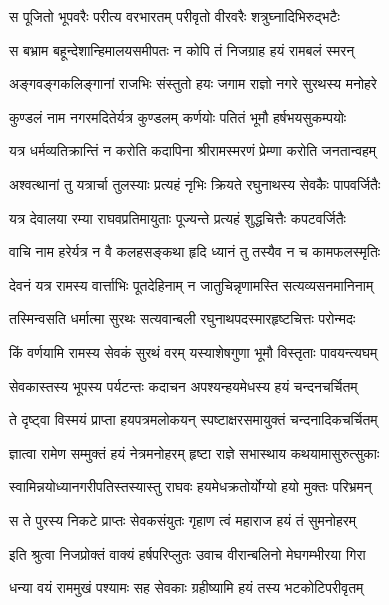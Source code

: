 \twolineshloka
{स पूजितो भूपवरैः परीत्य वरभारतम्}
{परीवृतो वीरवरैः शत्रुघ्नादिभिरुद्भटैः}%

\twolineshloka
{स बभ्राम बहून्देशान्हिमालयसमीपतः}
{न कोपि तं निजग्राह हयं रामबलं स्मरन्}%

\twolineshloka
{अङ्गवङ्गकलिङ्गानां राजभिः संस्तुतो हयः}
{जगाम राज्ञो नगरे सुरथस्य मनोहरे}%

\twolineshloka
{कुण्डलं नाम नगरमदितेर्यत्र कुण्डलम्}
{कर्णयोः पतितं भूमौ हर्षभयसुकम्पयोः}%

\twolineshloka
{यत्र धर्मव्यतिक्रान्तिं न करोति कदापिना}
{श्रीरामस्मरणं प्रेम्णा करोति जनतान्वहम्}%

\twolineshloka
{अश्वत्थानां तु यत्रार्चा तुलस्याः प्रत्यहं नृभिः}
{क्रियते रघुनाथस्य सेवकैः पापवर्जितैः}%

\twolineshloka
{यत्र देवालया रम्या राघवप्रतिमायुताः}
{पूज्यन्ते प्रत्यहं शुद्धचित्तैः कपटवर्जितैः}%

\twolineshloka
{वाचि नाम हरेर्यत्र न वै कलहसङ्कथा}
{हृदि ध्यानं तु तस्यैव न च कामफलस्मृतिः}%

\twolineshloka
{देवनं यत्र रामस्य वार्त्ताभिः पूतदेहिनाम्}
{न जातुचिन्नृणामस्ति सत्यव्यसनमानिनाम्}%

\twolineshloka
{तस्मिन्वसति धर्मात्मा सुरथः सत्यवान्बली}
{रघुनाथपदस्मारहृष्टचित्तः परोन्मदः}%

\twolineshloka
{किं वर्णयामि रामस्य सेवकं सुरथं वरम्}
{यस्याशेषगुणा भूमौ विस्तृताः पावयन्त्यघम्}%

\twolineshloka
{सेवकास्तस्य भूपस्य पर्यटन्तः कदाचन}
{अपश्यन्हयमेधस्य हयं चन्दनचर्चितम्}%

\twolineshloka
{ते दृष्ट्वा विस्मयं प्राप्ता हयपत्रमलोकयन्}
{स्पष्टाक्षरसमायुक्तं चन्दनादिकचर्चितम्}%

\twolineshloka
{ज्ञात्वा रामेण सम्मुक्तं हयं नेत्रमनोहरम्}
{हृष्टा राज्ञे सभास्थाय कथयामासुरुत्सुकाः}%

\twolineshloka
{स्वामिन्नयोध्यानगरीपतिस्तस्यास्तु राघवः}
{हयमेधक्रतोर्योग्यो हयो मुक्तः परिभ्रमन्}%

\twolineshloka
{स ते पुरस्य निकटे प्राप्तः सेवकसंयुतः}
{गृहाण त्वं महाराज हयं तं सुमनोहरम्}%


\twolineshloka
{इति श्रुत्वा निजप्रोक्तं वाक्यं हर्षपरिप्लुतः}
{उवाच वीरान्बलिनो मेघगम्भीरया गिरा}%


\twolineshloka
{धन्या वयं राममुखं पश्यामः सह सेवकाः}
{ग्रहीष्यामि हयं तस्य भटकोटिपरीवृतम्}%

